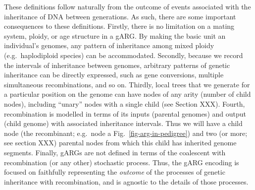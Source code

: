 \documentclass{article}
\newcommand{\noderef}[1]{\textsf{#1}}
\begin{document}
These definitions follow naturally from the outcome of events
associated with the inheritance of DNA between generations.
As such,
there are some important consequences to these definitions.
Firstly, there is
no limitation on a mating system, ploidy, or age structure in a gARG.
By making the
basic unit an individual's genomes,
any pattern of inheritance among mixed ploidy (e.g.\ haplodiploid
species) can be accommodated.
Secondly, because we record the intervals of inheritance
between genomes,
arbitrary patterns of genetic inheritance can be directly expressed, such as
gene conversions,
multiple simultaneous recombinations,
and so on.
Thirdly, local trees that we generate for a particular position on the
genome can have nodes of any arity (number of child nodes), including ``unary''
nodes with a single child (see Section XXX).
Fourth, recombination is modelled in terms of
its inputs (parental genomes) and output (child genome) with associated inheritance intervals.
Thus we will have a child node (the recombinant; e.g.\ node \noderef{a}
Fig.~\ref{fig-arg-in-pedigree}) and two (or more; see section XXX)
parental nodes from which this child has inherited genome segments.
Finally, gARGs are not defined in terms of the
coalescent with recombination (or any other) stochastic process.
Thus, the gARG encoding is focused on faithfully representing the
\emph{outcome} of the processes of genetic inheritance
with recombination,
and is agnostic to the details of those processes.
\end{document}
